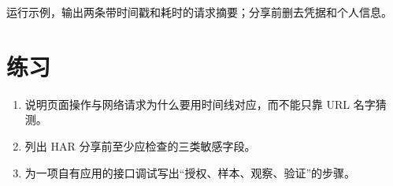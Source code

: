 \begin{tcolorbox}[title=本章验收,colframe=Teal,colback=Teal!3]
运行示例，输出两条带时间戳和耗时的请求摘要；分享前删去凭据和个人信息。
\end{tcolorbox}

\section{练习}
\begin{enumerate}[label=\arabic*.]
\item 说明页面操作与网络请求为什么要用时间线对应，而不能只靠 URL 名字猜测。
\item 列出 HAR 分享前至少应检查的三类敏感字段。
\item 为一项自有应用的接口调试写出“授权、样本、观察、验证”的步骤。
\end{enumerate}
